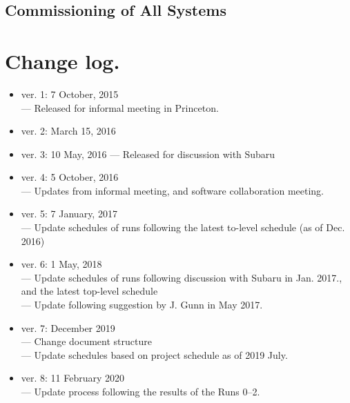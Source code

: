 \documentclass[11pt]{article}
\begin{document}
\renewcommand{\thesubsubsection}{A-\;\arabic{subsubsection}}
\subsection{Commissioning of All Systems}\label{sec:All}


%






\clearpage



\clearpage

%

\clearpage

\appendix



\section*{Change log.}
\begin{itemize}
\item ver. 1: 7 October, 2015 \\
--- Released for informal meeting in Princeton.
\item ver. 2:  March 15, 2016
\item ver. 3: 10 May, 2016
--- Released for discussion with Subaru
\item ver. 4: 5 October, 2016 \\
--- Updates from informal meeting, and software collaboration meeting.
\item ver. 5: 7 January, 2017 \\
--- Update schedules of runs following the latest to-level schedule (as of Dec. 2016)
\item ver. 6: 1 May, 2018 \\
--- Update schedules of runs following discussion with Subaru in Jan. 2017., and the latest top-level schedule \\
--- Update following suggestion by J. Gunn in May 2017.
\item ver. 7: December 2019 \\
--- Change document structure \\
--- Update schedules based on project schedule as of 2019 July.
\item ver. 8: 11 February 2020 \\
--- Update process following the results of the Runs 0--2.
\end{itemize}
\end{document}
